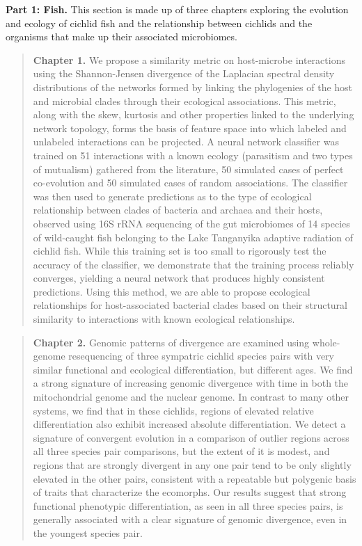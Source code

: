 \noindent\textbf{Part 1: Fish.} 
This section is made up of three chapters exploring the evolution and ecology of cichlid fish and the relationship between cichlids and the organisms that make up their associated microbiomes. 

\begin{quote}
\noindent\textbf{Chapter 1.} We propose a similarity metric on host-microbe interactions using the Shannon-Jensen divergence of the Laplacian spectral density distributions of the networks formed by linking the phylogenies of the host and microbial clades through their ecological associations. This metric, along with the skew, kurtosis and other properties linked to the underlying network topology, forms the basis of feature space into which labeled and unlabeled interactions can be projected. A neural network classifier was trained on 51 interactions with a known ecology (parasitism and two types of mutualism) gathered from the literature, 50 simulated cases of perfect co-evolution and 50 simulated cases of random associations. The classifier was then used to generate predictions as to the type of ecological relationship between clades of bacteria and archaea and their hosts, observed using 16S rRNA sequencing of the gut microbiomes of 14 species of wild-caught fish belonging to the Lake Tanganyika adaptive radiation of cichlid fish. While this training set is too small to rigorously test the accuracy of the classifier, we demonstrate that the training process reliably converges, yielding a neural network that produces highly consistent predictions. Using this method, we are able to propose ecological relationships for host-associated bacterial clades based on their structural similarity to interactions with known ecological relationships.\end{quote}


\begin{quote}
\noindent\textbf{Chapter 2.} Genomic patterns of divergence are examined using whole-genome resequencing of three sympatric cichlid species pairs with very similar functional and ecological differentiation, but different ages. We find a strong signature of increasing genomic divergence with time in both the mitochondrial genome and the nuclear genome. In contrast to many other systems, we find that in these cichlids, regions of elevated relative differentiation also exhibit increased absolute differentiation. We detect a signature of convergent evolution in a comparison of outlier regions across all three species pair comparisons, but the extent of it is modest, and regions that are strongly divergent in any one pair tend to be only slightly elevated in the other pairs, consistent with a repeatable but polygenic basis of traits that characterize the ecomorphs. Our results suggest that strong functional phenotypic differentiation, as seen in all three species pairs, is generally associated with a clear signature of genomic divergence, even in the youngest species pair.
\end{quote}

